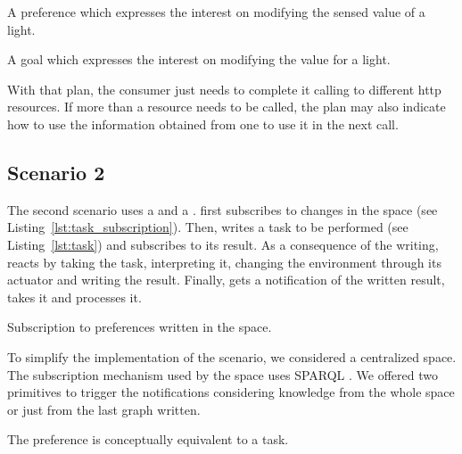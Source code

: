 \begin{listing}
  
  \caption{A preference which expresses the interest on modifying the sensed value of a light.}
  \label{lst:additional_information}
\end{listing}

\begin{listing}
  
  \caption{A goal which expresses the interest on modifying the value for a light.}
  \label{lst:light_goal}
\end{listing}

With that plan, the consumer just needs to complete it calling to different \acs{http} resources.
If more than a resource needs to be called, the plan may also indicate how to use the information obtained from one to use it in the next call.


\subsection{Scenario 2}
\label{sec:actuation_scn2}


The second scenario uses a \provb{} and a \consd{}.
\provb{} first subscribes to changes in the space (see Listing~\ref{lst:task_subscription}).
Then, \consd{} writes a task to be performed (see Listing~\ref{lst:task}) and subscribes to its result.
As a consequence of the writing, \provb{} reacts by taking the task, interpreting it, changing the environment through its actuator and writing the result.
Finally, \consd{} gets a notification of the written result, takes it and processes it.


\begin{listing}
  
  \caption{Subscription to preferences written in the space.}
  \label{lst:task_subscription}
\end{listing}


To simplify the implementation of the scenario, we considered a centralized space.
The subscription mechanism used by the space uses SPARQL .
We offered two primitives to trigger the notifications considering knowledge from the whole space or just from the last graph written.


\begin{listing}
  
  \caption{The preference is conceptually equivalent to a task.}
  \label{lst:task}
\end{listing}



